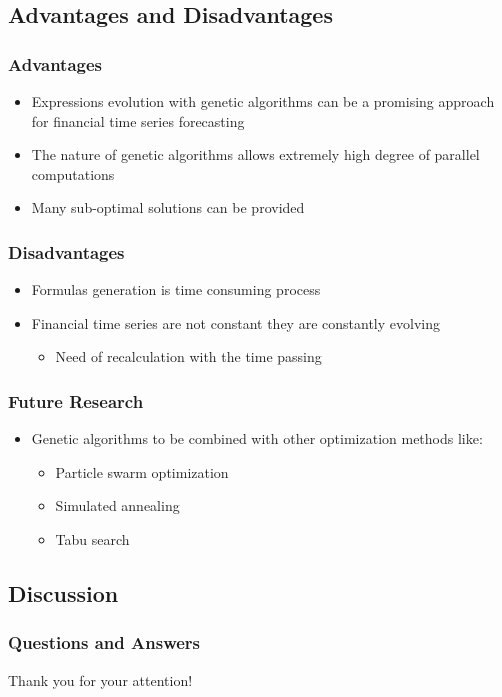 \documentclass{beamer}
\begin{document}
\subsection{Advantages and Disadvantages}

\begin{frame}
\frametitle{Advantages}
\begin{itemize}
	\item Expressions evolution with genetic algorithms can be a promising approach for financial time series forecasting
	\item The nature of genetic algorithms allows extremely high degree of parallel computations
	\item Many sub-optimal solutions can be provided
\end{itemize}
\end{frame}

\begin{frame}
\frametitle{Disadvantages}
\begin{itemize}
	\item Formulas generation is time consuming process
	\item Financial time series are not constant they are constantly evolving
	\begin{itemize}
		\item Need of recalculation with the time passing
	\end{itemize}
\end{itemize}
\end{frame}

\begin{frame}
\frametitle{Future Research}
\begin{itemize}
	\item Genetic algorithms to be combined with other optimization methods like:
	\begin{itemize}
		\item Particle swarm optimization
		\item Simulated annealing
		\item Tabu search
	\end{itemize}
\end{itemize}
\end{frame}

\subsection{Discussion}

\begin{frame}
\frametitle{Questions and Answers}
\center \huge{Thank you for your attention!}
\end{frame}
\end{document}
